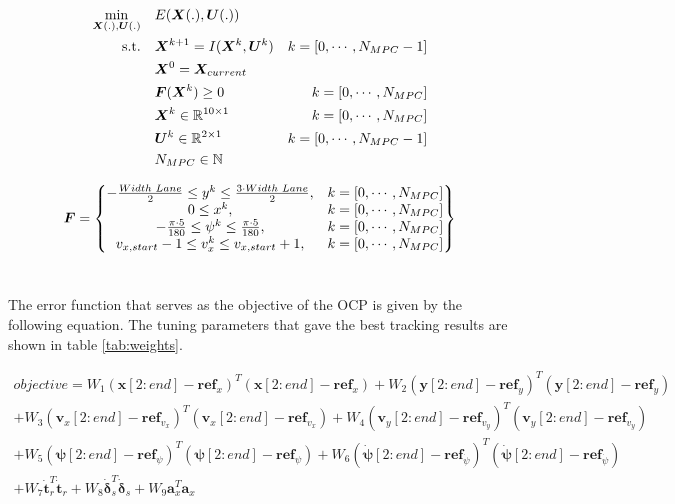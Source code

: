 \begin{equation}\label{opt:tracking}
\begin{aligned}
\min_{\bm{X}(.),\bm{U}(.)} \quad &  E(\bm{X}(.),\bm{U}(.)) \\
\textrm{s.t.} \quad & \bm{X}^{k+1} = I(\bm{X}^{k}, \bm{U}^{k}) & k = [0,\cdots, N_{MPC}-1]\\
& \bm{X}^{0} = \bm{X}_{current} \\
& \bm{F}(\bm{X}^{k}) \geq 0	& k = [0,\cdots, N_{MPC}]\\
& \bm{X}^{k}\in \mathbb{R}^{10\times 1}  & k = [0,\cdots, N_{MPC}]\\
& \bm{U}^{k}\in \mathbb{R}^{2\times 1} \hspace{3 mm} & k = [0,\cdots, N_{MPC}-1]\\
&  N_{MPC} \in \mathbb{N}
\end{aligned}
\end{equation}

\begin{equation}\label{eq:F_MPC}
\bm{F} =
\begin{Bmatrix}
-\frac{Width\hspace{1mm}Lane}{2} \leq y^k \leq \frac{3\cdot Width\hspace{1mm}Lane}{2}, & k = [0,\cdots, N_{MPC}] \\
0 \leq x^k, & k = [0,\cdots, N_{MPC}] \\
-\frac{\pi\cdot 5}{180} \leq \psi^k \leq \frac{\pi\cdot 5}{180}, & k = [0,\cdots, N_{MPC}] \\
v_{x,start}-1 \leq v_x^k \leq v_{x,start}+1, & k = [0,\cdots, N_{MPC}]
\end{Bmatrix}
\end{equation}\

The error function that serves as the objective of the OCP is given by the following equation. The tuning parameters that gave the best tracking results are shown in table \ref{tab:weights}.

\begin{multline*} 
objective=W_1(\bm{x}[2:end]-\bm{ref}_x)^T(\bm{x}[2:end]-\bm{ref}_x)+W_2(\bm{y}[2:end]-\bm{ref}_y)^T(\bm{y}[2:end]-\bm{ref}_y)\\
+W_3(\bm{v}_x[2:end]-\bm{ref}_{v_x})^T(\bm{v}_x[2:end]-\bm{ref}_{v_x})+W_4(\bm{v}_y[2:end]-\bm{ref}_{v_y})^T(\bm{v}_y[2:end]-\bm{ref}_{v_y})\\+W_5(\bm{\psi}[2:end]-\bm{ref}_{\psi})^T(\bm{\psi}[2:end]-\bm{ref}_\psi)
+W_6(\bm{\dot{\psi}}[2:end]-\bm{ref}_{\dot{\psi}})^T(\bm{\dot{\psi}}[2:end]-\bm{ref}_{\dot{\psi}})\\ + W_7\dot{\bm{t}}_r^T\dot{\bm{t}}_r+W_8\dot{\bm{\delta}}_s^T\dot{\bm{\delta}}_s + W_9\bm{a}_x^T\bm{a}_x
\end{multline*}

